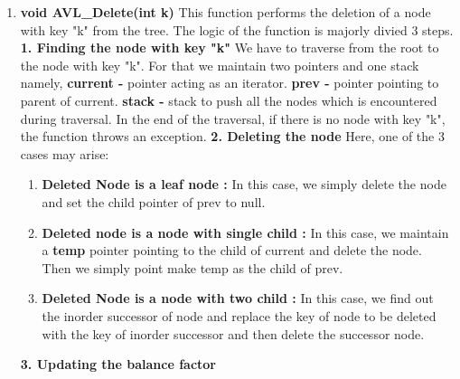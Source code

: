 \documentclass[12pt]{article}
\begin{document}
\begin{enumerate}
\begin{enumerate} [label=\roman*]
\begin{enumerate} [label=\roman*]
		        If a = -1, then insertion is done on the right of rebalancingPoint and left of temp. So, now RL rotation is performed.
            \end{enumerate}
        \end{enumerate}
    Time Complexity : O(h), where h = height of the tree.
    \item \textbf{void AVL\_Delete(int k)} \newline
    This function performs the deletion of a node with key "k" from the tree. The logic of the function is majorly divied 3 steps. \newline \newline
        \textbf{1. Finding the node with key "k"}\newline
        We have to traverse from the root to the node with key "k". For that we maintain two pointers and one stack namely, \newline
        \textbf{current - } pointer acting as an iterator.\newline
        \textbf{prev - } pointer pointing to parent of current.\newline
    \textbf{stack - } stack to push all the nodes which is encountered during traversal. \newline
    In the end of the traversal, if there is no node with key "k", the function throws an exception.\newline \newline
    \textbf{2. Deleting the node}\newline
    Here, one of the 3 cases may arise:
    \begin{enumerate}[label=\roman*]
        \item \textbf{Deleted Node is a leaf node :} In this case, we simply delete the node and set the child pointer of prev to null.
        \item \textbf{Deleted node is a node with single child : } In this case, we maintain a \textbf{temp} pointer pointing to the child of current and delete the node. Then we simply point make temp as the child of prev.
        \item \textbf{Deleted Node is a node with two child : }\newline
        In this case, we find out the inorder successor of node and replace the key of node to be deleted with the key of inorder successor and then delete the successor node. 
    \end{enumerate}
    \textbf{3. Updating the balance factor}\newline

\end{enumerate}
\end{document}

